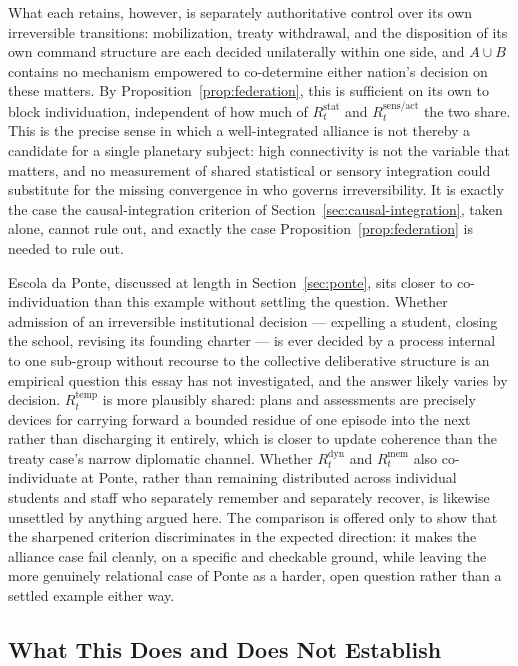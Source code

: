 \documentclass[11pt]{article}
\begin{document}
What each retains, however, is separately authoritative control over its own irreversible transitions: mobilization, treaty withdrawal, and the disposition of its own command structure are each decided unilaterally within one side, and $A\cup B$ contains no mechanism empowered to co-determine either nation's decision on these matters. By Proposition~\ref{prop:federation}, this is sufficient on its own to block individuation, independent of how much of $R^{\mathrm{stat}}_t$ and $R^{\mathrm{sens/act}}_t$ the two share. This is the precise sense in which a well-integrated alliance is not thereby a candidate for a single planetary subject: high connectivity is not the variable that matters, and no measurement of shared statistical or sensory integration could substitute for the missing convergence in who governs irreversibility. It is exactly the case the causal-integration criterion of Section~\ref{sec:causal-integration}, taken alone, cannot rule out, and exactly the case Proposition~\ref{prop:federation} is needed to rule out.

Escola da Ponte, discussed at length in Section~\ref{sec:ponte}, sits closer to co-individuation than this example without settling the question. Whether admission of an irreversible institutional decision --- expelling a student, closing the school, revising its founding charter --- is ever decided by a process internal to one sub-group without recourse to the collective deliberative structure is an empirical question this essay has not investigated, and the answer likely varies by decision. $R^{\mathrm{temp}}_t$ is more plausibly shared: plans and assessments are precisely devices for carrying forward a bounded residue of one episode into the next rather than discharging it entirely, which is closer to update coherence than the treaty case's narrow diplomatic channel. Whether $R^{\mathrm{dyn}}_t$ and $R^{\mathrm{mem}}_t$ also co-individuate at Ponte, rather than remaining distributed across individual students and staff who separately remember and separately recover, is likewise unsettled by anything argued here. The comparison is offered only to show that the sharpened criterion discriminates in the expected direction: it makes the alliance case fail cleanly, on a specific and checkable ground, while leaving the more genuinely relational case of Ponte as a harder, open question rather than a settled example either way.

\subsection{What This Does and Does Not Establish}
\end{document}

